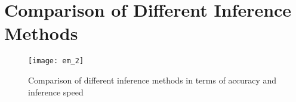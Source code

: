 \documentclass[../statistical_learning_notes.tex]{subfiles}
\begin{document}



\section*{Comparison of Different Inference Methods}
\begin{figure}[h]
\texttt{[image: em\_2]}
\centering
\caption{Comparison of different inference methods in terms of accuracy and inference speed}
\label{fig:em_2} %
\end{figure}



\end{document}

